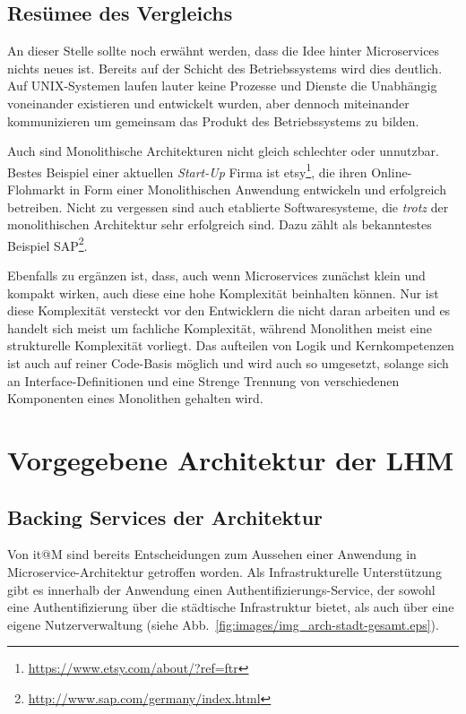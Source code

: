 \documentclass[12pt,a4paper,bibliography=totocnumbered,listof=totocnumbered]{scrartcl}
\begin{document}
\subsection{Resümee des Vergleichs}

An dieser Stelle sollte noch erwähnt werden, dass die Idee hinter Microservices nichts neues ist. Bereits auf der Schicht des Betriebssystems wird dies deutlich. Auf UNIX-Systemen laufen lauter keine Prozesse und Dienste die Unabhängig voneinander existieren und entwickelt wurden, aber dennoch miteinander kommunizieren um gemeinsam das Produkt des Betriebssystems zu bilden.\cite{hoff}

Auch sind Monolithische Architekturen nicht gleich schlechter oder unnutzbar. Bestes Beispiel einer aktuellen \textit{Start-Up} Firma ist etsy\footnote{\url{https://www.etsy.com/about/?ref=ftr}}, die ihren Online-Flohmarkt in Form einer Monolithischen Anwendung entwickeln und erfolgreich betreiben. Nicht zu vergessen sind auch etablierte Softwaresysteme, die \textit{trotz} der monolithischen Architektur sehr erfolgreich sind. Dazu zählt als bekanntestes Beispiel SAP\footnote{\url{http://www.sap.com/germany/index.html}}.

Ebenfalls zu ergänzen ist, dass, auch wenn Microservices zunächst klein und kompakt wirken, auch diese eine hohe Komplexität beinhalten können. Nur ist diese Komplexität versteckt vor den Entwicklern die nicht daran arbeiten und es handelt sich meist um fachliche Komplexität, während Monolithen meist eine strukturelle Komplexität vorliegt. Das aufteilen von Logik und Kernkompetenzen ist auch auf reiner Code-Basis möglich und wird auch so umgesetzt, solange sich an Interface-Definitionen und eine Strenge Trennung von verschiedenen Komponenten eines Monolithen gehalten wird.\cite{hoff}

\section{Vorgegebene Architektur der \acf{LHM}}\label{ch:arch-itm}

\subsection{Backing Services der Architektur}

Von it@M sind bereits Entscheidungen zum Aussehen einer Anwendung in Microservice-Architektur getroffen worden. Als Infrastrukturelle Unterstützung gibt es innerhalb der Anwendung einen Authentifizierungs-Service, der sowohl eine Authentifizierung über die städtische Infrastruktur bietet, als auch über eine eigene Nutzerverwaltung (siehe Abb.~\ref{fig:images/img_arch-stadt-gesamt.eps}).
\end{document}
